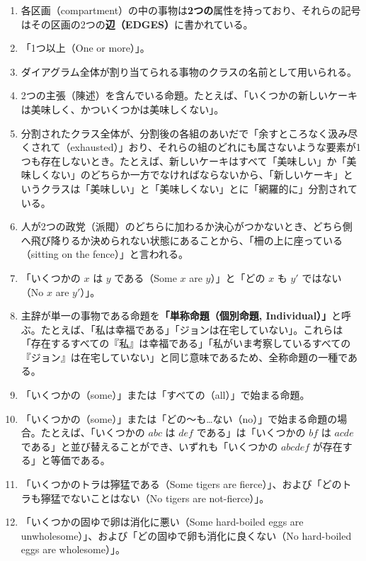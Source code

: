 \documentclass[a4paper,11pt,openany]{ltjsbook}
\begin{document}
\begin{enumerate}[label=\textbf{\arabic*.}]
主辞に属する事物のうち\textbf{皆無（NONE）}が、あるいは\textbf{すべて（ALL）}がしかじかであると述べる命題は\textbf{「全称命題（Universal）」}と呼ばれる。たとえば、「どの新しいケーキも美味しくない」「すべての新しいケーキは美味しくない」。
\item 各区画（compartment）の中の事物は\textbf{2つの}属性を持っており、それらの記号はその区画の2つの\textbf{辺（EDGES）}に書かれている。
\item 「1つ以上（One or more）」。
\item ダイアグラム全体が割り当てられる事物のクラスの名前として用いられる。
\item 2つの主張（陳述）を含んでいる命題。たとえば、「いくつかの新しいケーキは美味しく、かついくつかは美味しくない」。
\item 分割されたクラス全体が、分割後の各組のあいだで「余すところなく汲み尽くされて（exhausted）」おり、それらの組のどれにも属さないような要素が1つも存在しないとき。たとえば、新しいケーキはすべて「美味しい」か「美味しくない」のどちらか一方でなければならないから、「新しいケーキ」というクラスは「美味しい」と「美味しくない」とに「網羅的に」分割されている。
\item 人が2つの政党（派閥）のどちらに加わるか決心がつかないとき、どちら側へ飛び降りるか決められない状態にあることから、「柵の上に座っている（sitting on the fence）」と言われる。
\item 「いくつかの $x$ は $y$ である（Some $x$ are $y$）」と「どの $x$ も $y'$ ではない（No $x$ are $y'$）」。
\item 主辞が単一の事物である命題を\textbf{「単称命題（個別命題, Individual）」}と呼ぶ。たとえば、「私は幸福である」「ジョンは在宅していない」。これらは「存在するすべての『私』は幸福である」「私がいま考察しているすべての『ジョン』は在宅していない」と同じ意味であるため、全称命題の一種である。
\item 「いくつかの（some）」または「すべての（all）」で始まる命題。
\item 「いくつかの（some）」または「どの〜も…ない（no）」で始まる命題の場合。たとえば、「いくつかの $abc$ は $def$ である」は「いくつかの $bf$ は $acde$ である」と並び替えることができ、いずれも「いくつかの $abcdef$ が存在する」と等価である。
\item 「いくつかのトラは獰猛である（Some tigers are fierce）」、および「どのトラも獰猛でないことはない（No tigers are not-fierce）」。
\item 「いくつかの固ゆで卵は消化に悪い（Some hard-boiled eggs are unwholesome）」、および「どの固ゆで卵も消化に良くない（No hard-boiled eggs are wholesome）」。

\end{enumerate}
\end{document}

